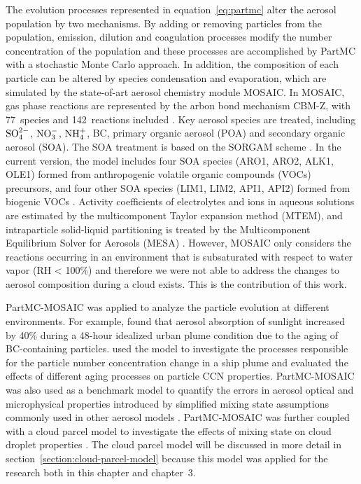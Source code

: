 \documentclass[edeposit,fullpage]{uiucthesis2009}
\begin{document}
The evolution processes represented in equation~\ref{eq:partmc} alter
the aerosol population by two mechanisms. By adding or removing
particles from the population, emission, dilution and coagulation
processes modify the number concentration of the population and these
processes are accomplished by PartMC with a stochastic Monte Carlo
approach. In addition, the composition of each particle can be altered
by species condensation and evaporation, which are simulated by the
state-of-art aerosol chemistry module MOSAIC. In MOSAIC, gas phase
reactions are represented by the arbon bond mechanism CBM-Z, with
77~species and 142~reactions included \citep{Zaveri1999}. Key aerosol
species are treated, including $\rm SO_4^{2-}$, $\rm NO_3^-$, $\rm
NH_4^+$, BC, primary organic aerosol (POA) and secondary organic
aerosol (SOA). The SOA treatment is based on the SORGAM scheme
\citep{schell2001modeling}. In the current version, the model includes
four SOA species (ARO1, ARO2, ALK1, OLE1) formed from anthropogenic
volatile organic compounds (VOCs) precursors, and four other SOA
species (LIM1, LIM2, API1, API2) formed from biogenic VOCs
\citep{ching2012impacts}. Activity coefficients of electrolytes and
ions in aqueous solutions are estimated by the multicomponent Taylor
expansion method (MTEM), and intraparticle solid-liquid partitioning
is treated by the Multicomponent Equilibrium Solver for Aerosols
(MESA) \citep{zaveri2005computationally}. However, MOSAIC only
considers the reactions occurring in an environment that is
subsaturated with respect to water vapor (RH < 100\%) and therefore we
were not able to address the changes to aerosol composition during a
cloud exists. This is the contribution of this work.

PartMC-MOSAIC was applied to analyze the particle evolution at
different environments. For example, \citet{Zaveri2010a} found that
aerosol absorption of sunlight increased by 40\% during a 48-hour
idealized urban plume condition due to the aging of BC-containing
particles. \citet{tian2014modeling} used the model to investigate the
processes responsible for the particle number concentration change in
a ship plume and evaluated the effects of different aging processes on
particle CCN properties. PartMC-MOSAIC was also used as a benchmark
model to quantify the errors in aerosol optical and microphysical
properties introduced by simplified mixing state assumptions commonly
used in other aerosol models \citep{Zaveri2010a, ching2012impacts,
  Fierce2017}. PartMC-MOSAIC was further coupled with a cloud parcel
model to investigate the effects of mixing state on cloud droplet
properties \citep{ching2012impacts, Ching2016}. The cloud parcel model
will be discussed in more detail in
section~\ref{section:cloud-parcel-model} because this model was
applied for the research both in this chapter and chapter~3.
\end{document}
